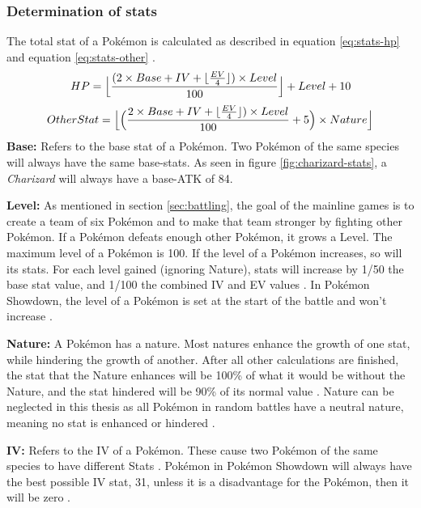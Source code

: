 \subsubsection{Determination of stats}
The total stat of a Pokémon is calculated as described in equation \ref{eq:stats-hp} and equation 
\ref{eq:stats-other} \cite{Bulbapedia:Stat}.
\begin{equation}
	\label{eq:stats-hp}
	HP = \Bigl\lfloor \frac{(2 \times Base + IV + \lfloor \frac{EV}{4} \rfloor) \times Level}{100}\Bigr\rfloor
	+ Level + 10 \\
\end{equation}
\begin{equation}
	\label{eq:stats-other}
	OtherStat = \Bigl\lfloor \Big( \frac{2 \times Base + IV + \lfloor \frac{EV}{4} \rfloor) \times Level}
	{100} + 5\Big) \times Nature \Bigr\rfloor
\end{equation}
\textbf{Base:} Refers to the base stat of a Pokémon. Two Pokémon of the same species will always have the 
same base-stats. As seen in figure \ref{fig:charizard-stats}, a \textit{Charizard} will always have a
base-\ac{ATK} of 84.

\textbf{Level:} As mentioned in section \ref{sec:battling}, the goal of the mainline games is to create 
a team of six Pokémon and to make that team stronger by fighting other Pokémon. If a Pokémon defeats
enough other Pokémon, it grows a Level. The maximum level of a Pokémon is 100. If the level of a Pokémon
increases, so will its stats. For each level gained (ignoring Nature), stats will increase by 1/50 the
base stat value, and 1/100 the combined \ac{IV} and \ac{EV} values \cite{Bulbapedia:Stat}. 
In Pokémon Showdown, the level of  a Pokémon is set at the start of the battle and won't 
increase \cite{Smogon:RandBatsGuide}.

\textbf{Nature:} A Pokémon has a nature. Most natures enhance the growth of one stat, while hindering
the growth of another. After all other calculations are finished, the stat that the Nature enhances will
be 100\% of what it would be without the Nature, and the stat hindered will be 90\% of its normal value
\cite{Bulbapedia:Stat}. Nature can be neglected in this thesis as all Pokémon in random battles have
a neutral nature, meaning no stat is enhanced or hindered \cite{Smogon:RandBatsGuide}.

\textbf{IV:} Refers to the \ac{IV} of a Pokémon. These cause two Pokémon of the same species to have
different Stats \cite{Bulbapedia:Stat}. Pokémon in Pokémon Showdown will always have the best possible \ac{IV} 
stat, 31, unless it is a disadvantage for the Pokémon, then it will be zero \cite{Smogon:RandBatsGuide}.

